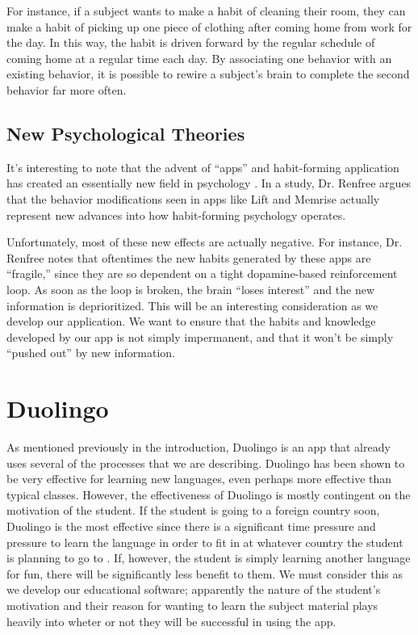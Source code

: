 For instance, if a subject wants to make a habit of cleaning their room, they can make a habit of picking up one piece of clothing after coming home from work for the day. In this way, the habit is driven forward by the regular schedule of coming home at a regular time each day. By associating one behavior with an existing behavior, it is possible to rewire a subject's brain to complete the second behavior far more often.

\subsection{New Psychological Theories}
It's interesting to note that the advent of ``apps'' and habit-forming application has created an essentially new field in psychology \cite{renfree2016don}. In a study, Dr. Renfree argues that the behavior modifications seen in apps like Lift and Memrise actually represent new advances into how habit-forming psychology operates.

Unfortunately, most of these new effects are actually negative. For instance, Dr. Renfree notes that oftentimes the new habits generated by these apps are ``fragile,'' since they are so dependent on a tight dopamine-based reinforcement loop. As soon as the loop is broken, the brain ``loses interest'' and the new 
information is deprioritized. This will be an interesting consideration as we develop our application. We want to ensure that the habits and knowledge developed by our app is not simply impermanent, and that it won't be simply ``pushed out'' by new information.




\section{Duolingo}
As mentioned previously in the introduction, Duolingo is an app that already uses several of the processes that we are describing. Duolingo has been shown to be very effective for learning new languages, even perhaps more effective than typical classes. However, the effectiveness of Duolingo is mostly contingent on the motivation of the student. If the student is going to a foreign country soon, Duolingo is the most effective since there is a significant time pressure and pressure to learn the language in order to fit in at whatever country the student is planning to go to \cite{vesselinov2012duolingo}. If, however, the student is simply learning another language for fun, there will be significantly less benefit to them. We must consider this as we develop our educational software; apparently the nature of the student's motivation and their reason for wanting to learn the subject material plays heavily into wheter or not they will be successful in using the app.